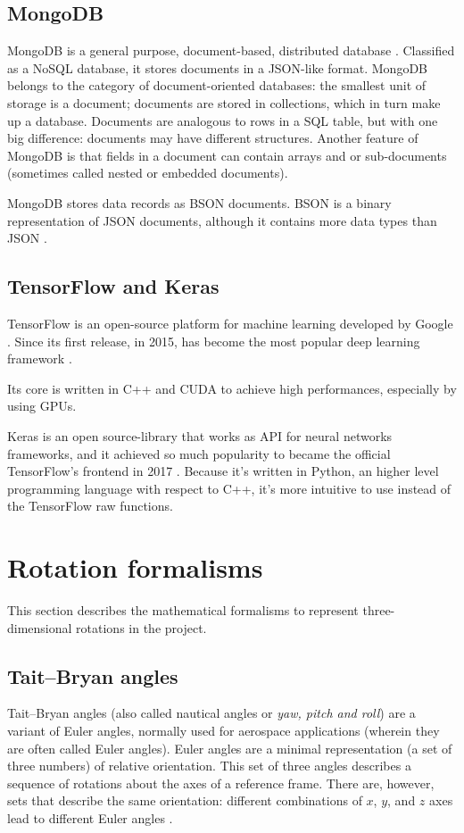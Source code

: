 \subsection{MongoDB}
MongoDB is a general purpose, document-based, distributed database \cite{MongoDB}. Classified as a NoSQL database, it stores documents in a JSON-like format. MongoDB belongs to the category of document-oriented databases: the smallest unit of storage is a document; documents are stored in collections, which in turn make up a database. Documents are analogous to rows in a SQL table, but with one big difference: documents may have different structures. Another feature of MongoDB is that fields in a document can contain arrays and or sub-documents (sometimes called nested or embedded documents).

MongoDB stores data records as BSON documents. BSON is a binary representation of JSON documents, although it contains more data types than JSON \cite{BSONSpec}.

\subsection{TensorFlow and Keras}
TensorFlow is an open-source platform for machine learning developed by Google \cite{tensorflow15}. Since its first release, in 2015, has become the most popular deep learning framework \cite{Kha19}.

Its core is written in C++ and CUDA to achieve high performances, especially by using GPUs.
\bigbreak

Keras is an open source-library that works as API for neural networks frameworks, and it achieved so much popularity to became the official TensorFlow's frontend in 2017 \cite{WhyKeras}. Because it's written in Python, an higher level programming language with respect to C++, it's more intuitive to use instead of the TensorFlow raw functions.

\section{Rotation formalisms}
This section describes the mathematical formalisms to represent three-dimensional rotations in the project.

\subsection{Tait–Bryan angles}
Tait–Bryan angles (also called nautical angles or \textit{yaw, pitch and roll}) are a variant of Euler angles, normally used for aerospace applications (wherein they are often called Euler angles). Euler angles are a minimal representation (a set of three numbers) of relative orientation. This set of three angles describes a sequence of rotations about the axes of a reference frame. There are, however, sets that describe the same orientation: different combinations of $x$, $y$, and $z$ axes lead to different Euler angles \cite{Rob20}.

